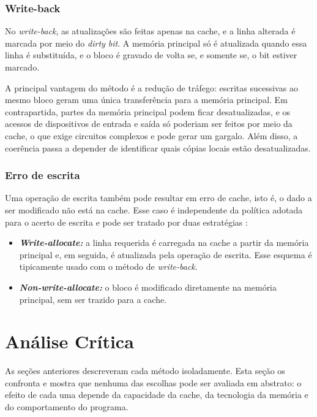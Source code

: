 \documentclass[12pt]{article}
\begin{document}
\subsubsection{Write-back}

No \textit{write-back}, as atualizações são feitas apenas na cache, e a
linha alterada é marcada por meio do \textit{dirty bit}. A memória principal
só é atualizada quando essa linha é substituída, e o bloco é gravado de
volta se, e somente se, o bit estiver marcado.

A principal vantagem do método é a redução de tráfego: escritas sucessivas
ao mesmo bloco geram uma única transferência para a memória principal.
Em contrapartida, partes da memória principal podem ficar desatualizadas, e
os acessos de dispositivos de entrada e saída só poderiam ser feitos por
meio da cache, o que exige circuitos complexos e pode gerar um gargalo.
Além disso, a coerência passa a depender de identificar quais cópias locais
estão desatualizadas.

\subsubsection{Erro de escrita}

Uma operação de escrita também pode resultar em erro de cache, isto é, o
dado a ser modificado não está na cache. Esse caso é independente da
política adotada para o acerto de escrita e pode ser tratado por duas
estratégias \cite{stallings2017}:

\begin{itemize}
  \renewcommand{\labelitemi}{$\triangleright$}
  \setlength{\itemsep}{3pt}

  \item \textit{\textbf{Write-allocate:}} a linha requerida é carregada
  na cache a partir da memória principal e, em seguida, é atualizada pela
  operação de escrita. Esse esquema é tipicamente usado com o método de
  \textit{write-back}.

  \item \textit{\textbf{Non-write-allocate:}} o bloco é modificado
  diretamente na memória principal, sem ser trazido para a cache.
\end{itemize}

\section{Análise Crítica}

As seções anteriores descreveram cada método isoladamente. Esta seção
os confronta e mostra que nenhuma das escolhas pode ser avaliada em
abstrato: o efeito de cada uma depende da capacidade da cache, da
tecnologia da memória e do comportamento do programa.
\end{document}
